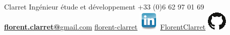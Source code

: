 \documentclass[]{friggeri-cv}
\begin{document}
				{Clarret} 
				{Ingénieur étude et développement}
				{+33 (0)6 62 97 01 69}
				{\href{mailto:florent.clarret@gmail.com}{\textbf{florent.clarret@}gmail.com} }
				{\href{https://www.linkedin.com/in/florent-clarret/}{florent-clarret} \includegraphics{img/linkedin.png} }
				{\href{https://github.com/FlorentClarret}{FlorentClarret} \includegraphics{img/github.png}}
	
\end{document}
